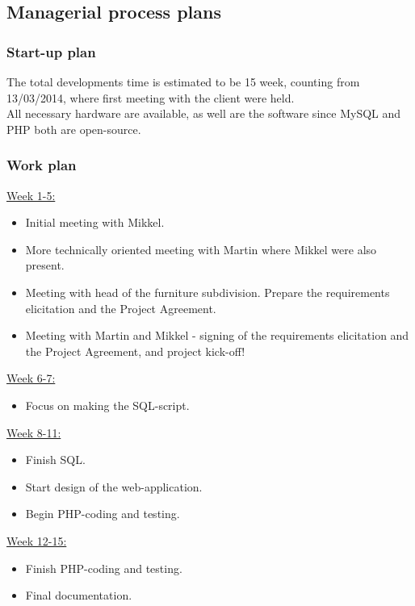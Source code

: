 \documentclass[12pt]{article}
\begin{document}
\subsection{Managerial process plans}
\subsubsection{Start-up plan}
The total developments time is estimated to be 15 week, counting from 13/03/2014, where first meeting with the client were held. \\
All necessary hardware are available, as well are the software since MySQL and PHP both are open-source.
\subsubsection{Work plan}
\underline{Week 1-5:}
\begin{itemize}
\item Initial meeting with Mikkel.
\item More technically oriented meeting with Martin where Mikkel were also present.
\item Meeting with head of the furniture subdivision.
Prepare the requirements elicitation and the Project Agreement.
\item Meeting with Martin and Mikkel - signing of the requirements elicitation and the Project Agreement, and project kick-off!
\end{itemize}
\underline{Week 6-7:}
\begin{itemize}
\item Focus on making the SQL-script.
\end{itemize}
\underline{Week 8-11:}
\begin{itemize}
\item Finish SQL.
\item Start design of the web-application.
\item Begin PHP-coding and testing.
\end{itemize}
\underline{Week 12-15:}
\begin{itemize}
\item Finish PHP-coding and testing.
\item Final documentation.
\end{itemize}
\end{document}
